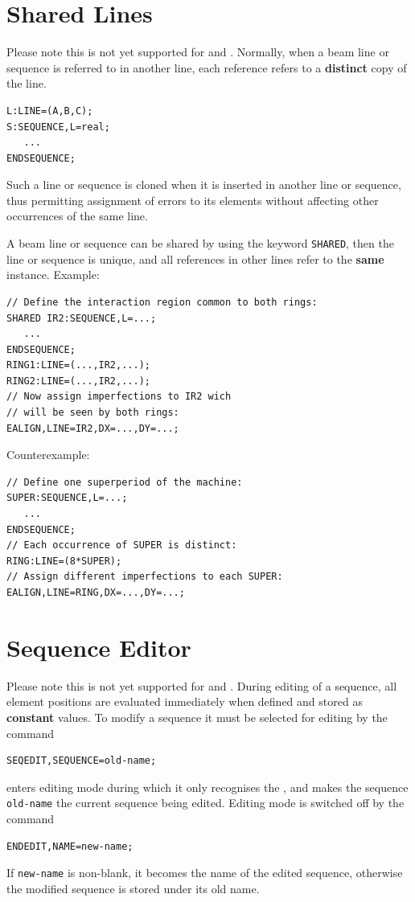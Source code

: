 \section{Shared Lines}
\label{sec:seq-class}
Please note this is not yet supported for \noopalt and \noopalcycl .
Normally, when a beam line or sequence is referred to in another line,
each reference refers to a \textbf{distinct} copy of the line.
\begin{verbatim}
L:LINE=(A,B,C);
S:SEQUENCE,L=real;
   ...
ENDSEQUENCE;
\end{verbatim}
Such a line or sequence is cloned when it is inserted in another line
or sequence, thus permitting assignment of errors to its elements
without affecting other occurrences of the same line.

A beam line or sequence can be shared by using the keyword
\texttt{SHARED},
then the line or sequence is unique,
and all references in other lines refer to the \textbf{same} instance.
Example:
\begin{verbatim}
// Define the interaction region common to both rings:
SHARED IR2:SEQUENCE,L=...;
   ...
ENDSEQUENCE;
RING1:LINE=(...,IR2,...);
RING2:LINE=(...,IR2,...);
// Now assign imperfections to IR2 wich 
// will be seen by both rings:
EALIGN,LINE=IR2,DX=...,DY=...;
\end{verbatim}
Counterexample:
\begin{verbatim}
// Define one superperiod of the machine:
SUPER:SEQUENCE,L=...;
   ...
ENDSEQUENCE;
// Each occurrence of SUPER is distinct:
RING:LINE=(8*SUPER);
// Assign different imperfections to each SUPER:
EALIGN,LINE=RING,DX=...,DY=...;
\end{verbatim}

\section{Sequence Editor}
\label{sec:editor}
Please note this is not yet supported for \noopalt and \noopalcycl .
During editing of a sequence, all element positions are evaluated 
immediately when defined and stored as \textbf{constant} values.
To modify a sequence it must be selected for editing by the command
\begin{verbatim}
SEQEDIT,SEQUENCE=old-name;
\end{verbatim}
\opal enters editing mode during which it only recognises the 
,
and makes the sequence \texttt{old-name} the current sequence being edited.
Editing mode is switched off by the command
\begin{verbatim}
ENDEDIT,NAME=new-name;
\end{verbatim}
If \texttt{new-name} is non-blank, it becomes the name of the edited sequence,
otherwise the modified sequence is stored under its old name.


